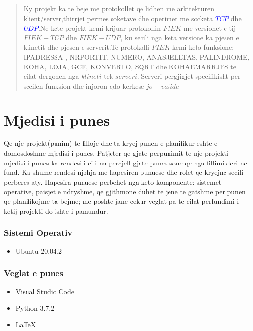 \documentclass[]{article}
\begin{document}
\begin{abstract}
\begin{center}


Ky projekt ka te beje me protokollet qe lidhen me arkitekturen klient/server,thirrjet permes  soketave dhe operimet me socketa \textcolor{blue} {$TCP$} dhe \textcolor{blue}{$UDP$}.Ne kete projekt kemi krijuar protokollin $FIEK$ me versionet e tij $FIEK-TCP$ dhe $FIEK-UDP$, ku secili nga keta versione ka pjesen e klinetit dhe pjesen e serverit.Te protokolli $FIEK$ kemi keto funksione: IPADRESSA , NRPORTIT, NUMERO, ANASJELLTAS,  PALINDROME, KOHA, LOJA, GCF, KONVERTO, SQRT dhe KOHAEMARRJES te cilat dergohen nga $klineti$ tek $serveri$.
Serveri pergjigjet specifikisht per secilen funksion dhe injoron qdo kerkese $jo-valide$


\end{center}

\end{abstract}
\thispagestyle{empty}

\newpage


\tableofcontents
\newpage
\section{Mjedisi i punes}
Qe nje projekt(punim) te filloje dhe ta kryej punen e planifikur eshte e domosdoshme mjedisi i punes. Patjeter qe gjate perpunimit te nje projekti mjedisi i punes ka rendesi i cili na percjell gjate punes sone qe nga fillimi deri ne fund. Ka shume rendesi njohja me hapesiren punuese dhe rolet qe kryejne secili perberes aty.
Hapesira punuese perbehet nga keto komponente:
sistemet operative, paisjet e ndryshme,  qe gjithmone duhet te jene te gatshme per punen qe planifikojme ta bejme; me poshte jane  cekur veglat pa te cilat perfundimi i ketij projekti do ishte i pamundur.
\vspace*{1cm}
\subsubsection{Sistemi  Operativ}
\begin{itemize}
\item Ubuntu 20.04.2 
\end{itemize}
\vspace*{0.3cm}

\subsubsection{Veglat e punes}
\begin{itemize}
\item Visual Studio Code
\item Python 3.7.2
\item \LaTeX
\end{itemize}
\end{document}
